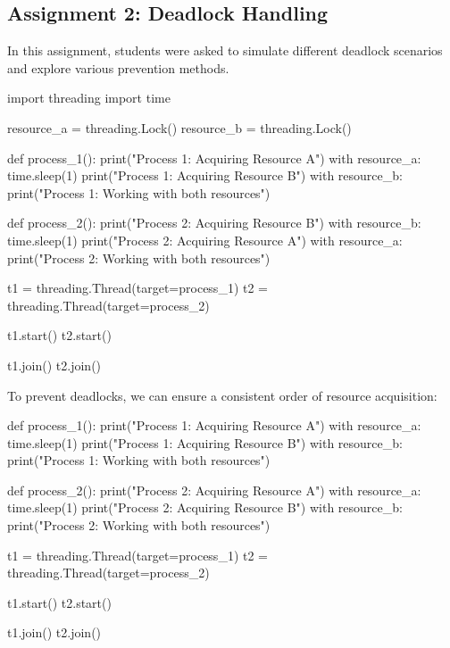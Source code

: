 \documentclass[12pt]{article}
\begin{document}
\subsection{Assignment 2: Deadlock Handling}
In this assignment, students were asked to simulate different deadlock scenarios and explore various prevention methods.

\begin{python}
    import threading
    import time
    
    resource_a = threading.Lock()
    resource_b = threading.Lock()
    
    def process_1():
        print("Process 1: Acquiring Resource A")
        with resource_a:
            time.sleep(1)  
            print("Process 1: Acquiring Resource B")
            with resource_b:
                print("Process 1: Working with both resources")
    
    def process_2():
        print("Process 2: Acquiring Resource B")
        with resource_b:
            time.sleep(1)  
            print("Process 2: Acquiring Resource A")
            with resource_a:
                print("Process 2: Working with both resources")
    
    t1 = threading.Thread(target=process_1)
    t2 = threading.Thread(target=process_2)
    
    t1.start()
    t2.start()
    
    t1.join()
    t2.join()
    \end{python}
    
    To prevent deadlocks, we can ensure a consistent order of resource acquisition:
    
    \begin{python}
    def process_1():
        print("Process 1: Acquiring Resource A")
        with resource_a:
            time.sleep(1)  
            print("Process 1: Acquiring Resource B")
            with resource_b:
                print("Process 1: Working with both resources")
    
    def process_2():
        print("Process 2: Acquiring Resource A")
        with resource_a:
            time.sleep(1)  
            print("Process 2: Acquiring Resource B")
            with resource_b:
                print("Process 2: Working with both resources")
    
    
    t1 = threading.Thread(target=process_1)
    t2 = threading.Thread(target=process_2)
    
    
    t1.start()
    t2.start()
    
    t1.join()
    t2.join()
    \end{python}
\end{document}
